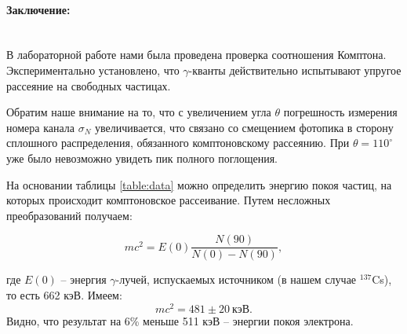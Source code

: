 \documentclass[a4paper, 12pt]{article}
\newcommand{\parag}[1]{\paragraph*{#1:}}
\begin{document}
\parag {Заключение} ~\\
    В лабораторной работе нами была проведена проверка соотношения Комптона. Экспериментально установлено, что $\gamma$-кванты действительно испытывают упругое рассеяние на свободных частицах. 
	
	Обратим наше внимание на то, что с увеличением угла $\theta$ погрешность измерения номера канала $\sigma_N$ увеличивается, что связано со смещением фотопика в сторону сплошного распределения, обязанного комптоновскому рассеянию. При $\theta = 110^\circ$ уже было невозможно увидеть пик полного поглощения.
	
	На основании таблицы \ref{table:data} можно определить энергию покоя частиц, на которых происходит комптоновское рассеивание. Путем несложных преобразований получаем:

	\begin{equation*}
		mc^2 = E(0) \frac{N(90)}{N(0)-N(90)},
	\end{equation*}
	
    где $E(0)$ -- энергия $\gamma$-лучей, испускаемых источником (в нашем случае $^{137}$Cs), то есть 662 кэВ. Имеем:
	\[
	\boxed{mc^2 = 481 \pm 20 \ \text{кэВ}}.
	\]
	Видно, что результат на 6\% меньше 511 кэВ -- энергии покоя электрона. 
\end{document}

